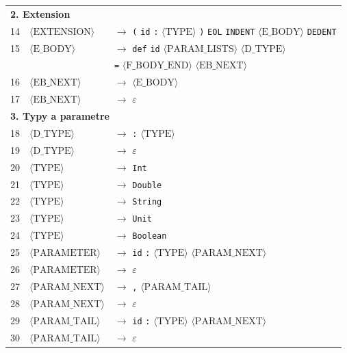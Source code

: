 \begin{longtable}{l l l}
\midrule
\multicolumn{3}{l}{\textbf{2. Extension}} \\[2pt]
14 & $\langle\text{EXTENSION}\rangle$ & $\rightarrow$ \texttt{(} \texttt{id} \texttt{:} $\langle\text{TYPE}\rangle$ \texttt{)} \texttt{EOL} \texttt{INDENT} $\langle\text{E\_BODY}\rangle$ \texttt{DEDENT} \\
15 & $\langle\text{E\_BODY}\rangle$ & $\rightarrow$ \texttt{def} \texttt{id} $\langle\text{PARAM\_LISTS}\rangle$ $\langle\text{D\_TYPE}\rangle$ \\
 & & \hspace{1.2em}\texttt{=} $\langle\text{F\_BODY\_END}\rangle$ $\langle\text{EB\_NEXT}\rangle$ \\
16 & $\langle\text{EB\_NEXT}\rangle$ & $\rightarrow$ $\langle\text{E\_BODY}\rangle$ \\
17 & $\langle\text{EB\_NEXT}\rangle$ & $\rightarrow$ $\varepsilon$ \\
\midrule
\multicolumn{3}{l}{\textbf{3. Typy a parametre}} \\[2pt]
18 & $\langle\text{D\_TYPE}\rangle$ & $\rightarrow$ \texttt{:} $\langle\text{TYPE}\rangle$ \\
19 & $\langle\text{D\_TYPE}\rangle$ & $\rightarrow$ $\varepsilon$ \\
20 & $\langle\text{TYPE}\rangle$ & $\rightarrow$ \texttt{Int} \\
21 & $\langle\text{TYPE}\rangle$ & $\rightarrow$ \texttt{Double} \\
22 & $\langle\text{TYPE}\rangle$ & $\rightarrow$ \texttt{String} \\
23 & $\langle\text{TYPE}\rangle$ & $\rightarrow$ \texttt{Unit} \\
24 & $\langle\text{TYPE}\rangle$ & $\rightarrow$ \texttt{Boolean} \\
25 & $\langle\text{PARAMETER}\rangle$ & $\rightarrow$ \texttt{id} \texttt{:} $\langle\text{TYPE}\rangle$ $\langle\text{PARAM\_NEXT}\rangle$ \\
26 & $\langle\text{PARAMETER}\rangle$ & $\rightarrow$ $\varepsilon$ \\
27 & $\langle\text{PARAM\_NEXT}\rangle$ & $\rightarrow$ \texttt{,} $\langle\text{PARAM\_TAIL}\rangle$ \\
28 & $\langle\text{PARAM\_NEXT}\rangle$ & $\rightarrow$ $\varepsilon$ \\
29 & $\langle\text{PARAM\_TAIL}\rangle$ & $\rightarrow$ \texttt{id} \texttt{:} $\langle\text{TYPE}\rangle$ $\langle\text{PARAM\_NEXT}\rangle$ \\
30 & $\langle\text{PARAM\_TAIL}\rangle$ & $\rightarrow$ $\varepsilon$ \\

\end{longtable}

